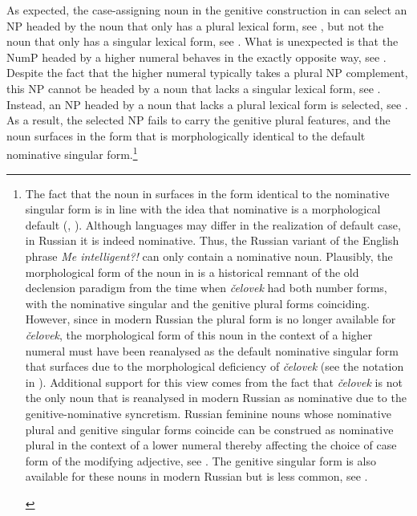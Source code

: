 \documentclass[output=paper,
modfonts,
newtxmath,
hidelinks
]{langscibook}
\begin{document}
As expected, the case-assigning noun in the genitive construction in  can select an NP headed by the noun that only has a plural lexical form, see , but not the noun that only has a singular lexical form, see . What is unexpected is that the NumP headed by a higher numeral behaves in the exactly opposite way, see . Despite the fact that the higher numeral typically takes a plural NP complement, this NP cannot be headed by a noun that lacks a singular lexical form, see . Instead, an NP headed by a noun that lacks a plural lexical form is selected, see . As a result, the selected NP fails to carry the genitive plural features, and the noun surfaces in the form that is morphologically identical to the default nominative singular form.\footnote{\label{18:fn3}The fact that the noun in  surfaces in the form identical to the nominative singular form is in line with the idea that nominative is a morphological default (\citealt{Marantz1991}, \citealt{Schütze1997, Schütze2001}). Although languages may differ in the realization of default case, in Russian it is indeed nominative. Thus, the Russian variant of the English phrase \textit{Me intelligent?!} can only contain a nominative noun. Plausibly, the morphological form of the noun in  is a historical remnant of the old declension paradigm from the time when \textit{čelovek} had both number forms, with the nominative singular and the genitive plural forms coinciding. However, since in modern Russian the plural form is no longer available for \textit{čelovek}, the morphological form of this noun in the context of a higher numeral must have been reanalysed as the default nominative singular form that surfaces due to the morphological deficiency of \textit{čelovek} (see the notation in ).   Additional support for this view comes from the fact that \textit{čelovek} is not the only noun that is reanalysed in modern Russian as nominative due to the genitive-nominative syncretism. Russian feminine nouns whose nominative plural and genitive singular forms coincide can be construed as nominative plural in the context of a lower numeral thereby affecting the choice of case form of the modifying adjective, see . The genitive singular form is also available for these nouns in modern Russian but is less common, see .

\begin{multicols}{2}
\ea \label{18:fn3i1}
	\label{18:fn3i}\columnbreak
    \label{18:fn3ii}
    \z
\z
\end{multicols}

}
\end{document}
